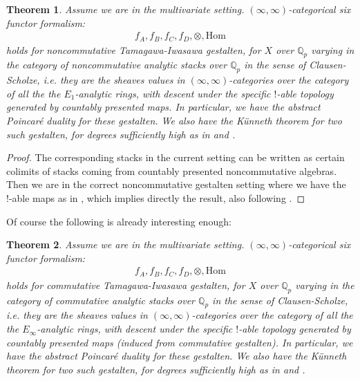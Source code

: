 \documentclass[12pt]{article}
\newtheorem{theorem}{Theorem}
\theoremstyle{definition}
\begin{document}
\begin{theorem}
Assume we are in the multivariate setting. $(\infty,\infty)$-categorical six functor formalism:
\begin{align}
f_A,f_B,f_C,f_D,\otimes,\mathrm{Hom}
\end{align}
holds for noncommutative Tamagawa-Iwasawa gestalten, for $X$ over $\mathbb{Q}_p$ varying in the category of noncommutative analytic stacks over $\mathbb{Q}_p$ in the sense of Clausen-Scholze, i.e. they are the sheaves values in $(\infty,\infty)$-categories over the category of all the the $E_1$-analytic rings, with descent under the specific $!$-able topology generated by countably presented maps. In particular, we have the abstract Poincar\'e duality for these gestalten. We also have the K\"unneth theorem for two such gestalten, for degrees sufficiently high as in \cite[Corollary 5.3, Corollary 5.4]{5S5} and \cite{5Ga}. 
\end{theorem}

\begin{proof}
The corresponding stacks in the current setting can be written as certain colimits of stacks coming from countably presented noncommutative algebras. Then we are in the correct noncommutative gestalten setting where we have the !-able maps as in \cite[Corollary 5.3, Corollary 5.4]{5S5}, which implies directly the result, also following \cite{5Ga}.
\end{proof}

\noindent Of course the following is already interesting enough:

\begin{theorem}
Assume we are in the multivariate setting. $(\infty,\infty)$-categorical six functor formalism:
\begin{align}
f_A,f_B,f_C,f_D,\otimes,\mathrm{Hom}
\end{align}
holds for commutative Tamagawa-Iwasawa gestalten, for $X$ over $\mathbb{Q}_p$ varying in the category of commutative analytic stacks over $\mathbb{Q}_p$ in the sense of Clausen-Scholze, i.e. they are the sheaves values in $(\infty,\infty)$-categories over the category of all the the $E_\infty$-analytic rings, with descent under the specific $!$-able topology generated by countably presented maps (induced from commutative gestalten). In particular, we have the abstract Poincar\'e duality for these gestalten. We also have the K\"unneth theorem for two such gestalten, for degrees sufficiently high as in \cite[Corollary 5.3, Corollary 5.4]{5S5} and \cite{5Ga}. 
\end{theorem}
\end{document}
